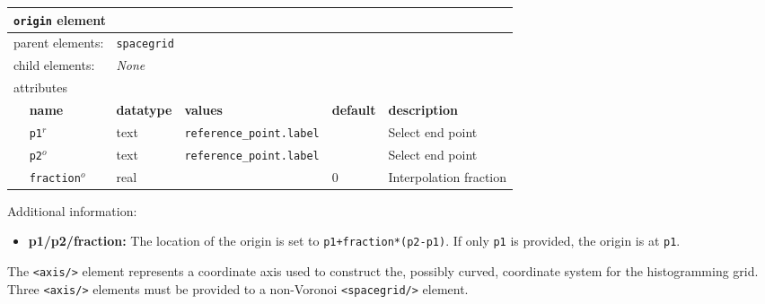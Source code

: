 \FloatBarrier
\begin{table}[h]
\begin{center}
\begin{tabularx}{\textwidth}{l l l l l l }
\hline
\multicolumn{6}{l}{\texttt{origin} element} \\
\hline
\multicolumn{2}{l}{parent elements:} & \multicolumn{4}{l}{\texttt{spacegrid}}\\
\multicolumn{2}{l}{child  elements:} & \multicolumn{4}{l}{\textit{None}}\\
\multicolumn{2}{l}{attributes}  & \multicolumn{4}{l}{}\\
   &   \bfseries name     & \bfseries datatype & \bfseries values & \bfseries default   & \bfseries description \\
   &   \texttt{p1}$^r$      &  text              & \texttt{reference\_point.label}   &    &  Select end point       \\
   &   \texttt{p2}$^o$      &  text              & \texttt{reference\_point.label}   &    &  Select end point       \\
   &   \texttt{fraction}$^o$&  real              &                  &  0                  &  Interpolation fraction \\
  \hline
\end{tabularx}
\end{center}
\end{table}
Additional information:
\begin{itemize}
  \item{\textbf{p1/p2/fraction:} The location of the origin is set to \texttt{p1+fraction*(p2-p1)}.  If only \texttt{p1} is provided, the origin is at \texttt{p1}.}
\end{itemize}
\FloatBarrier


The \texttt{<axis/>} element represents a coordinate axis used to construct the, possibly curved, coordinate system for the histogramming grid.  Three \texttt{<axis/>} elements must be provided to a non-Voronoi \texttt{<spacegrid/>} element.

